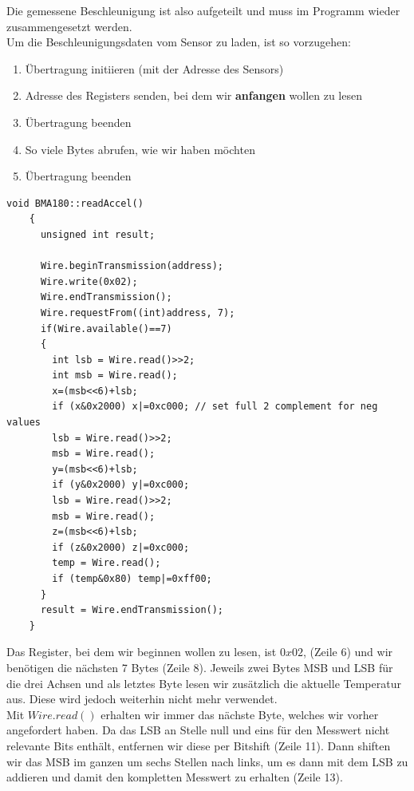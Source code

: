 \documentclass[12pt,a4paper]{scrartcl}
\begin{document}
Die gemessene Beschleunigung ist also aufgeteilt und muss im Programm wieder zusammengesetzt werden. \\

Um die Beschleunigungsdaten vom Sensor zu laden, ist so vorzugehen:
\begin{enumerate}
	\item Übertragung initiieren (mit der Adresse des Sensors)
	\item Adresse des Registers senden, bei dem wir \textbf{anfangen} wollen zu lesen
	\item Übertragung beenden
	\item So viele Bytes abrufen, wie wir haben möchten
	\item Übertragung beenden
\end{enumerate}

\begin{lstlisting}[frame=trBL]
	void BMA180::readAccel()
	{
	  unsigned int result;

	  Wire.beginTransmission(address);
	  Wire.write(0x02);
	  Wire.endTransmission();
	  Wire.requestFrom((int)address, 7);
	  if(Wire.available()==7)
	  {
	    int lsb = Wire.read()>>2;
	    int msb = Wire.read();
	    x=(msb<<6)+lsb; 
	    if (x&0x2000) x|=0xc000; // set full 2 complement for neg values
	    lsb = Wire.read()>>2;
	    msb = Wire.read();
	    y=(msb<<6)+lsb;
	    if (y&0x2000) y|=0xc000;
	    lsb = Wire.read()>>2;
	    msb = Wire.read();
	    z=(msb<<6)+lsb;
	    if (z&0x2000) z|=0xc000;
	    temp = Wire.read();
	    if (temp&0x80) temp|=0xff00;
	  }
	  result = Wire.endTransmission();
	}
\end{lstlisting}

Das Register, bei dem wir beginnen wollen zu lesen, ist $0x02$, (Zeile 6) und wir benötigen die nächsten 7 Bytes (Zeile 8). Jeweils zwei Bytes MSB und LSB für die drei Achsen und als letztes Byte lesen wir zusätzlich die aktuelle Temperatur aus. Diese wird jedoch weiterhin nicht mehr verwendet.\\

Mit $Wire.read()$ erhalten wir immer das nächste Byte, welches wir vorher angefordert haben. Da das LSB an Stelle null und eins für den Messwert nicht relevante Bits enthält, entfernen wir diese per Bitshift (Zeile 11). Dann shiften wir das MSB im ganzen um sechs Stellen nach links, um es dann mit dem LSB zu addieren und damit den kompletten Messwert zu erhalten (Zeile 13).\\
\end{document}
